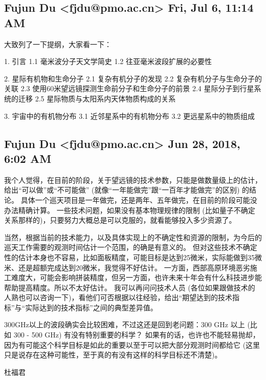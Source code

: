 \documentclass{article}
\newcommand\from[2]{\subsection{{#1} {#2}}}
\newcommand\said[1]{#1}
\begin{document}
\from{
Fujun Du <fjdu@pmo.ac.cn>
}{
Fri, Jul 6, 11:14 AM
}
\said{
大致列了一下提纲，大家看一下：

1. 引言
1.1 毫米波分子天文学简史
1.2 往亚毫米波段扩展的必要性

2. 星际有机物和生命分子
2.1 复杂有机分子的发现
2.2 复杂有机分子与生命分子的关联
2.3 使用60米望远镜探测生命前分子和生命分子的前景
2.4 星际分子到行星系统的迁移
2.5 星际物质与太阳系内天体物质构成的关系

3. 宇宙中的有机物分布
3.1 近邻星系中的有机物分布
3.2 更远星系中的物质组成
}


\from{
Fujun Du <fjdu@pmo.ac.cn>
}{
Jun 28, 2018, 6:02 AM
}
\said{
我个人觉得，在目前的阶段，关于望远镜的技术参数，只能是做数量级上的估计，给出“可以做”或“不可能做” (就像“一年能做完”跟“一百年才能做完”的区别) 的结论。
具体一个巡天项目是一年做完，还是两年、五年做完，在目前的阶段可能没办法精确计算。
一些技术问题，如果没有基本物理规律的限制 (比如量子不确定关系那样的)，只要努力大概总是可以克服的，就看能够投入多少资源了。

当然，根据当前的技术能力，以及具体实现上的不确定性和资源的限制，为今后的巡天工作需要的观测时间估计一个范围，的确是有意义的。
但对这些技术不确定性的估计本身也不容易，比如面板精度，可能目标是达到25微米，实际能做到35微米、还是超额完成达到20微米，我觉得不好估计。
一方面，西部高原环境恶劣施工难度大，可能会影响拼装精度，但另一方面，也许未来十年会有什么科技进步能帮助提高精度。所以不太好估计。
我可以再问问技术人员 (各位如果跟做技术的人熟也可以咨询一下)，看他们可否根据以往经验，给出“期望达到的技术指标”与“实际达到的技术指标”之间的典型差异值。

300GHz以上的波段确实会比较困难，不过这还是回到老问题：300 GHz 以上 (比如 300 - 500 GHz) 有没有特别重要的科学？
如果有的话，也许也不能轻易抛却，因为有可能这个科学目标是如此的重要以至于可以把大部分观测时间都给它 (这里只是说存在这种可能性，至于真的有没有这样的科学目标还不清楚)。

杜福君
}
\end{document}
